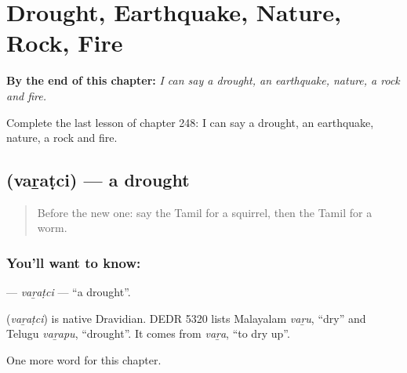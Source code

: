 
\chapter{Drought, Earthquake, Nature, Rock, Fire}
\label{ch:ta-drought-earthquake-nature-rock-fire}

\begin{chapteropening}
\textbf{By the end of this chapter:} \emph{I can say a drought, an earthquake, nature, a rock and fire.}

Complete the last lesson of chapter 248: I can say a drought, an earthquake, nature, a rock and fire.
\end{chapteropening}

\section[\texorpdfstring{\ta{வறட்சி} (vaṟaṭci)}{வறட்சி (vaṟaṭci)}]{ (vaṟaṭci) — a drought}

\label{lesson:TA-C248-varatci}



\begin{quote}
Before the new one: say the Tamil for a squirrel, then the Tamil for a worm.
\end{quote}

\subsection*{You'll want to know: }
\textbf{} — \emph{vaṟaṭci} — \textquotedblleft{}a drought\textquotedblright{}.

\begin{cousinweb}
\textbf{} (\emph{vaṟaṭci}) is native Dravidian. DEDR 5320 lists Malayalam \emph{vaṟu}, \textquotedblleft{}dry\textquotedblright{} and Telugu \emph{vaṟapu}, \textquotedblleft{}drought\textquotedblright{}. It comes from \emph{vaṟa}, \textquotedblleft{}to dry up\textquotedblright{}.
\end{cousinweb}

\begin{grammarlens}[title={What you've built}]
One more word for this chapter.
\end{grammarlens}

